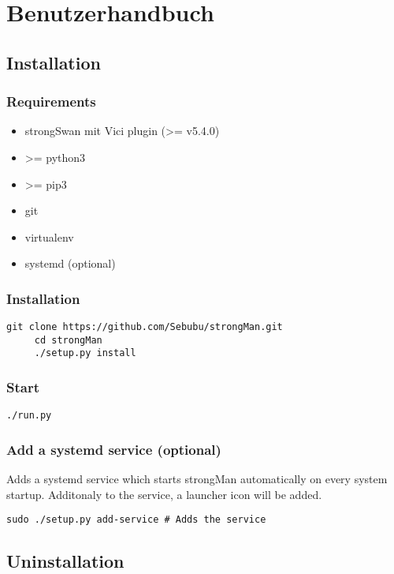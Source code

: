 \section{Benutzerhandbuch}

\subsection{Installation}
\subsubsection{Requirements}
\begin{itemize}
	\item strongSwan mit Vici plugin (>= v5.4.0)
	\item >= python3
	\item >= pip3
	\item git
	\item virtualenv
	\item systemd (optional)
\end{itemize}
\subsubsection{Installation}
\begin{lstlisting}[style=BashInputStyle]
	 git clone https://github.com/Sebubu/strongMan.git
	 cd strongMan
	 ./setup.py install
\end{lstlisting}

\subsubsection{Start}
\begin{lstlisting}[style=BashInputStyle]
	 ./run.py
\end{lstlisting}

\subsubsection{Add a systemd service (optional)}
Adds a systemd service which starts strongMan automatically on every system startup. Additonaly to the service, a launcher icon will be added.
\begin{lstlisting}[style=BashInputStyle]
    sudo ./setup.py add-service # Adds the service
\end{lstlisting}

\subsection{Uninstallation}
